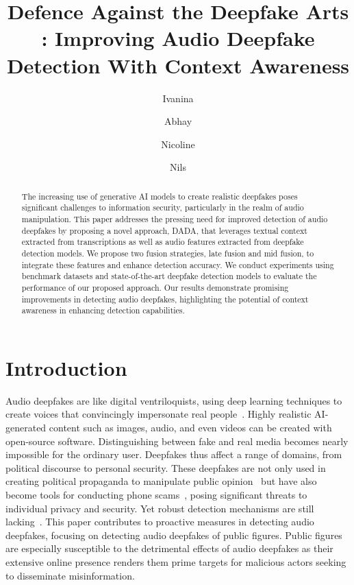 \documentclass{Interspeech}
\title{Defence Against the Deepfake Arts : Improving Audio Deepfake Detection With Context Awareness}
\author[affiliation={1*}]{Ivanina}{Ivanova}
\author[affiliation={1*}]{Abhay}{Dayal Mathur}
\author[affiliation={1, 2*}]{Nicoline}{Nymand-Andersen}
\author[affiliation={1}]{Nils}{Holzenberger}
\affiliation{Telecom Paris}{Institut Polytechnique de Paris}{France}
\affiliation{Department of Computer Science}{Technische Universität München}{Germany}
\begin{document}
\maketitle

\begin{abstract}

  The increasing use of generative AI models to create realistic deepfakes poses significant challenges to information security, particularly in the realm of audio manipulation. This paper addresses the pressing need for improved detection of audio deepfakes by proposing a novel approach, DADA, that leverages textual context extracted from transcriptions as well as audio features extracted from deepfake detection models. We propose two fusion strategies, late fusion and mid fusion, to integrate these features and enhance detection accuracy. We conduct experiments using benchmark datasets and state-of-the-art deepfake detection models to evaluate the performance of our proposed approach. Our results demonstrate promising improvements in detecting audio deepfakes, highlighting the potential of context awareness in enhancing detection capabilities.
\end{abstract}

\section{Introduction}
\label{sec:introduction}


Audio deepfakes are like digital ventriloquists, using deep learning techniques
to create voices that convincingly impersonate real people~\cite{adversarial}.
Highly realistic AI-generated content such as images, audio, and even videos
can be created with open-source software. Distinguishing
between fake and real media becomes nearly impossible for the ordinary user.
Deepfakes thus affect a range of domains, from political discourse to personal
security. These deepfakes are not only used in creating political propaganda to
manipulate public opinion~\cite{stuanescuinformational} but have also become
tools for conducting phone scams~\cite{mirsky2022dfcaptcha}, posing significant
threats to individual privacy and security. Yet robust detection mechanisms are
still lacking~\cite{in_the_wild}. This paper contributes to proactive measures
in detecting audio deepfakes, focusing on detecting audio deepfakes of public
figures. Public figures are especially susceptible to the detrimental effects
of audio deepfakes as their extensive online presence renders them prime
targets for malicious actors seeking to disseminate misinformation.
\end{document}
